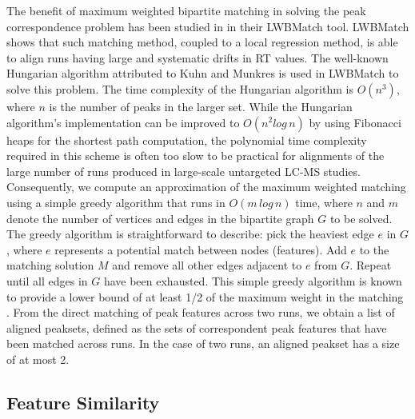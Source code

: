 The benefit of maximum weighted bipartite matching in solving the peak correspondence problem has been studied in \cite{Wang2013} in their LWBMatch tool. LWBMatch shows that such matching method, coupled to a local regression method, is able to align runs having large and systematic drifts in RT values. The well-known Hungarian algorithm \cite{Kuhn1955} attributed to Kuhn and Munkres is used in LWBMatch to solve this problem. The time complexity of the Hungarian algorithm is $O(n^{3})$, where $n$ is the number of peaks in the larger set. While the Hungarian algorithm's implementation can be improved to $O(n^{2}log\, n)$ by using Fibonacci heaps for the shortest path computation, the polynomial time complexity required in this scheme is often too slow to be practical for alignments of the large number of runs produced in large-scale untargeted LC-MS studies. Consequently, we compute an approximation of the maximum weighted matching using a simple greedy algorithm that runs in $O(m\, log\, n)$ time, where $n$ and $m$ denote the number of vertices and edges in the bipartite graph $G$ to be solved. The greedy algorithm is straightforward to describe: pick the heaviest edge $e$ in $G$, where $e$ represents a potential match between nodes (features). Add $e$ to the matching solution $M$ and remove all other edges adjacent to $e$ from $G$. Repeat until all edges in $G$ have been exhausted. This simple greedy algorithm is known to provide a lower bound of at least 1/2 of the maximum weight in the matching \cite{Maximum2011}. From the direct matching of peak features across two runs, we obtain a list of aligned peaksets, defined as the sets of correspondent peak features that have been matched across runs. In the case of two runs, an aligned peakset has a size of at most 2.

\subsection{Feature Similarity}

